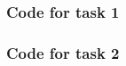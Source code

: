 \documentclass[a4paper,10pt]{article}
\begin{document}
\newpage
\subsubsection*{Code for task 1}



\newpage
\subsubsection*{Code for task 2}


\end{document}
